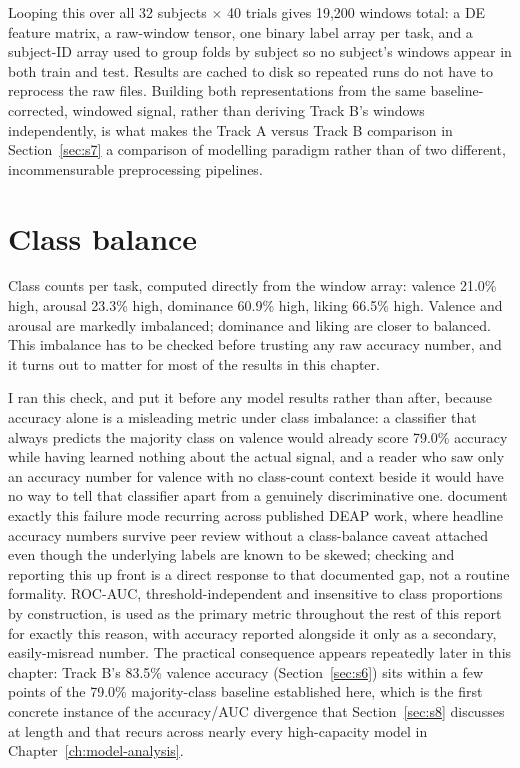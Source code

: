 \documentclass[11pt]{report}
\begin{document}
Looping this over all 32 subjects $\times$ 40 trials gives 19{,}200 windows
total: a DE feature matrix, a raw-window tensor, one binary label array per
task, and a subject-ID array used to group folds by subject so no subject's
windows appear in both train and test. Results are cached to disk so
repeated runs do not have to reprocess the raw files. Building both
representations from the same baseline-corrected, windowed signal, rather
than deriving Track B's windows independently, is what makes the Track A
versus Track B comparison in Section~\ref{sec:s7} a comparison of modelling
paradigm rather than of two different, incommensurable preprocessing
pipelines.

\section{Class balance}
\label{sec:s4}
Class counts per task, computed directly from the window array: valence
21.0\% high, arousal 23.3\% high, dominance 60.9\% high, liking 66.5\% high.
Valence and arousal are markedly imbalanced; dominance and liking are closer
to balanced. This imbalance has to be checked before trusting any raw
accuracy number, and it turns out to matter for most of the results in this
chapter.

I ran this check, and put it before any model results rather than after,
because accuracy alone is a misleading metric under class imbalance: a
classifier that always predicts the majority class on valence would already
score 79.0\% accuracy while having learned nothing about the actual signal,
and a reader who saw only an accuracy number for valence with no class-count
context beside it would have no way to tell that classifier apart from a
genuinely discriminative one. \citet{khan_ndreviewfailures} document exactly
this failure mode recurring across published DEAP work, where headline
accuracy numbers survive peer review without a class-balance caveat attached
even though the underlying labels are known to be skewed; checking and
reporting this up front is a direct response to that documented gap, not a
routine formality. ROC-AUC, threshold-independent and insensitive to class
proportions by construction, is used as the primary metric throughout the
rest of this report for exactly this reason, with accuracy reported
alongside it only as a secondary, easily-misread number. The practical
consequence appears repeatedly later in this chapter: Track B's 83.5\%
valence accuracy (Section~\ref{sec:s6}) sits within a few points of the
79.0\% majority-class baseline established here, which is the first concrete
instance of the accuracy/AUC divergence that Section~\ref{sec:s8} discusses
at length and that recurs across nearly every high-capacity model in
Chapter~\ref{ch:model-analysis}.
\end{document}
